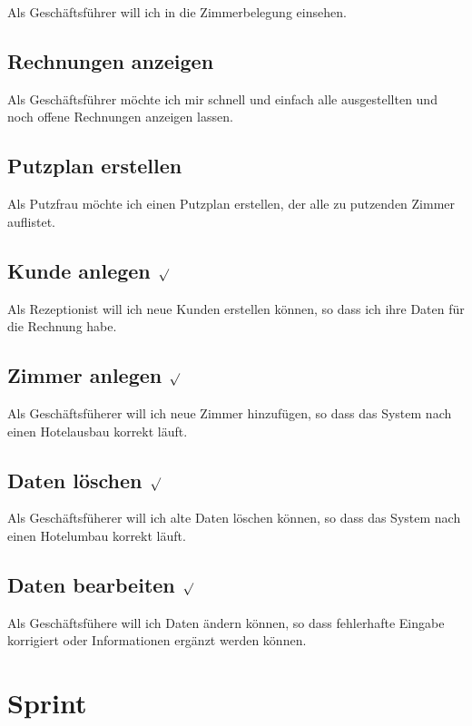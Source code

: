 \documentclass[11pt]{scrartcl}
\begin{document}
Als Geschäftsführer will ich in die Zimmerbelegung einsehen.

\subsection{Rechnungen anzeigen}

Als Geschäftsführer möchte ich mir schnell und einfach alle ausgestellten und noch offene Rechnungen anzeigen lassen.

\subsection{Putzplan erstellen}

Als Putzfrau möchte ich einen Putzplan erstellen, der alle zu putzenden Zimmer auflistet.

\subsection{Kunde anlegen $\surd$}

Als Rezeptionist will ich neue Kunden erstellen können, so dass ich ihre Daten für die Rechnung habe.

\subsection{Zimmer anlegen $\surd$}

Als Geschäftsfüherer will ich neue Zimmer hinzufügen, so dass das System nach einen Hotelausbau korrekt läuft.

\subsection{Daten löschen $\surd$}

Als Geschäftsfüherer will ich alte Daten löschen können, so dass das System nach einen Hotelumbau korrekt läuft.

\subsection{Daten bearbeiten $\surd$}

Als Geschäftsfühere will ich Daten ändern können, so dass fehlerhafte Eingabe korrigiert oder Informationen ergänzt werden können.

\section{Sprint}
\end{document}
